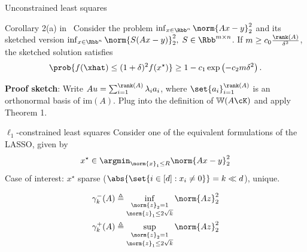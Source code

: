 \documentclass[10pt]{beamer}
\newcommand{\xstar}{x^{\star}}
\begin{document}
\begin{frame}{Unconstrained least squares}
    \begin{block}{Corollary 2(a) in~\cite{PilWain15}}
        Consider the problem $\inf_{x \in \Rbb^n} \norm{Ax - y}_2^2$ and its
        sketched version $\inf_{x \in \Rbb^n} \norm{S(Ax - y)}_2^2, \;
        S \in \Rbb^{m \times n}$. If $m \geq c_0 \frac{\rank(A)}{\delta^2}$, the
        sketched solution satisfies
        \[
            \prob{f(\xhat) \leq (1 + \delta)^2 f(\xstar)}
            \geq 1 - c_1 \exp\left(-c_2 m \delta^2\right).
        \]
    \end{block}
    \vspace{1em}

    \textbf{Proof sketch}:
        Write $Au = \sum_{i=1}^{\rank(A)} \lambda_i a_i$, where
        $\set{a_i}_{i=1}^{\rank(A)}$ is an orthonormal basis of
        $\mathrm{im}(A)$. Plug into the definition of $\mathbb{W}(A \cK)$
        and apply Theorem 1.
\end{frame}


\begin{frame}{$\ell_1$-constrained least squares}
    Consider one of the equivalent formulations of the LASSO, given by
    \[
        \xstar \in \argmin_{\norm{x}_1 \leq R} \norm{Ax - y}_2^2
    \]
    Case of interest: $\xstar$ sparse ($\abs{\set{i \in [d]: x_i \neq 0}} = k
    \ll
    d$),
    unique.
    \vspace{1em}
    \begin{center}
        \begin{tcolorbox}[colback=cred!20, colframe=cred,
            title={\textbf{Key quantities}: $\ell_1$-restricted eigenvalues},
            boxrule=0.2mm, width=(0.75 \linewidth)]
        \begin{align}
            \begin{aligned}
                \gamma_k^-(A) & \triangleq
                    \inf_{\substack{\norm{z}_2 = 1 \\ \norm{z}_1 \leq 2
                    \sqrt{k}}} \norm{Az}_2^2 \\
                \gamma_k^+(A) & \triangleq
                    \sup_{\substack{\norm{z}_2 = 1 \\ \norm{z}_1 \leq
                    2 \sqrt{k}}} \norm{Az}_2^2
            \end{aligned}
            \label{eq:ell_1_eigs}
        \end{align}
        \end{tcolorbox}
    \end{center}
\end{frame}
\end{document}

